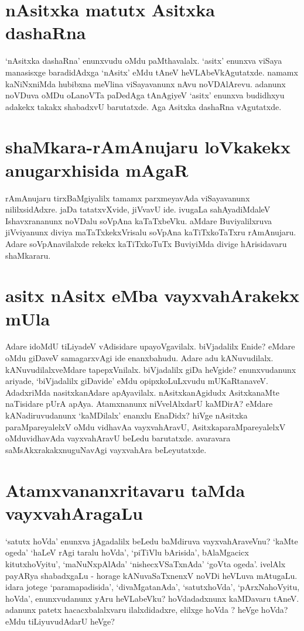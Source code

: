 \section*{nAsitxka matutx Asitxka dashaRna}

`nAsitxka dashaRna' enunxvudu oMdu paMthavalalx. `asitx' enunxva viSaya manasisxge baradidAdxga `nAsitx' eMdu tAneV heVLAbeVkAgutatxde. namamx kaNiNxniMda hubibxna meVlina viSayavanunx nAvu noVDAlArevu. adanunx noVDuva oMDu oLanoVTa paDedAga tAnAgiyeV `asitx' enunxva budidhxyu adakekx takakx shabadxvU barutatxde. Aga Asitxka dashaRna vAgutatxde.

\section*{shaMkara-rAmAnujaru loVkakekx anugarxhisida mAgaR}

rAmAnujaru tirxBaMgiyalilx tamamx parxmeyavAda viSayavanunx nililxsidAdxre. jaDa tatatxvXvide, jiVvavU ide. ivugaLa sahAyadiMdaleV Ishavxrananunx noVDalu soVpAna kaTaTxbeVku. aMdare Buviyalilxruva jiVviyanunx diviya maTaTxkekxVrisalu soVpAna kaTiTxkoTaTxru rAmAnujaru. Adare soVpAnavilalxde rekekx  kaTiTxkoTuTx BuviyiMda divige hArisidavaru shaMkararu.

\section*{asitx nAsitx eMba vayxvahArakekx mUla}

Adare idoMdU tiLiyadeV vAdisidare upayoVgavilalx. biVjadalilx Enide? eMdare oMdu giDaveV samagarxvAgi ide enanxbahudu. Adare adu kANuvudilalx. kANuvudilalxveMdare tapepxVnilalx. biVjadalilx giDa heVgide? enunxvudanunx ariyade, `biVjadalilx giDavide' eMdu opipxkoLuLxvudu mUKaRtanaveV. AdadxriMda nasitxkanAdare apAyavilalx. nAsitxkanAgidudx AsitxkanaMte naTisidare pUrA apAya. Atamxnanunx niVvelAlxdarU kaMDirA? eMdare kANadiruvudanunx `kaMDilalx' enanxlu EnaDidx? hiVge nAsitxka paraMpareyalelxV oMdu vidhavAa vayxvahAravU, AsitxkaparaMpareyalelxV oMduvidhavAda vayxvahAravU beLedu barutatxde. avaravara saMsAkxrakakxnuguNavAgi vayxvahAra beLeyutatxde.

\section*{Atamxvananxritavaru taMda vayxvahAragaLu}

`satutx hoVda' enunxva jAgadalilx beLedu baMdiruva vayxvahAraveVnu? `kaMte ogeda' `haLeV rAgi taralu hoVda', `piTiVlu bArisida', bAlaMgacicx kitutxhoVyitu', `maNuNxpAlAda' `nishecxVSaTxnAda' `goVta ogeda'. ivelAlx payARya shabadxgaLu - horage kANuvaSaTxnenxV noVDi heVLuva mAtugaLu. idara jotege `paramapadisida', `divaMgatanAda', `satutxhoVda', `pArxNahoVyitu, hoVda', enunxvudanunx yAru heVLabeVku? hoVdadadxnunx kaMDavaru tAneV. adanunx patetx hacacxbalalxvaru ilalxdidadxre, elilxge hoVda ? heVge hoVda? eMdu tiLiyuvudAdarU heVge?

